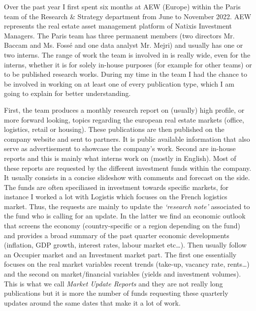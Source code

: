 \quad Over the past year I first spent six months at AEW (Europe) within the Paris team of the Research \& Strategy department from June to November 2022. 
AEW represents the real estate asset management platform of Natixis Investment Managers. 
The Paris team has three permanent members (two directors Mr. Baccam and Ms. Fossé and one data analyst Mr. Mejri) and usually has one or two interns. 
The range of work the team is involved in is really wide, even for the interns, whether it is for solely in-house purposes (for example for other teams) or to be published research works. 
During my time in the team I had the chance to be involved in working on at least one of every publication type, which I am going to explain for better understanding. 

First, the team produces a monthly research report on (usually) high profile, or more forward looking, topics regarding the european real estate markets (office, logistics, retail or housing). 
These publications are then published on the company website and sent to partners. 
It is public available information that also serve as advertisement to showcase the company’s work. 
Second are in-house reports and this is mainly what interns work on (mostly in English). 
Most of these reports are requested by the different investment funds within the company. 
It usually consists in a concise slideshow with comments and forecast on the side. 
The funds are often speciliased in investment towards specific markets, for instance I worked a lot with Logistis which focuses on the French logistics market. 
Thus, the requests are mainly to update the \textit{‘research note’} associated to the fund who is calling for an update. 
In the latter we find an economic outlook that screens the economy (country-specific or a region depending on the fund) and provides a broad summary of the past quarter economic developments (inflation, GDP growth, interest rates, labour market etc…). 
Then usually follow an Occupier market and an Investment market part. 
The first one essentially focuses on the real market variables recent trends (take-up, vacancy rate, rents…) and the second on market/financial variables (yields and investment volumes). 
This is what we call \textit{Market Update Reports} and they are not really long publications but it is more the number of funds requesting these quarterly updates around the same dates that make it a lot of work.

